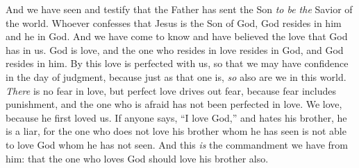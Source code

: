 \begin{biblechapter}
\verse And we have seen and testify that the Father has sent the Son \textit{to be the} Savior of the world.
\verse Whoever confesses that Jesus is the Son of God, God resides in him and he in God.
\verse And we have come to know and have believed the love that God has in us. God is love, and the one who resides in love resides in God, and God resides in him.
\verse By this love is perfected with us, so that we may have confidence in the day of judgment, because just as that one is, \textit{so} also are we in this world.
\verse \textit{There} is no fear in love, but perfect love drives out fear, because fear includes punishment, and the one who is afraid has not been perfected in love.
\verse We love, because he first loved us.
\verse If anyone says, “I love God,” and hates his brother, he is a liar, for the one who does not love his brother whom he has seen is not able to love God whom he has not seen.
\verse And this \textit{is} the commandment we have from him: that the one who loves God should love his brother also.
\end{biblechapter}

